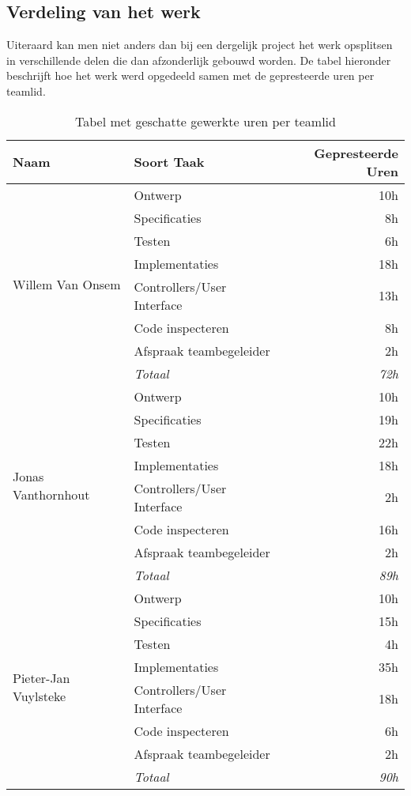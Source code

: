 \subsection{Verdeling van het werk}
Uiteraard kan men niet anders dan bij een dergelijk project het werk opsplitsen in verschillende delen die dan afzonderlijk gebouwd worden. De tabel hieronder beschrijft hoe het werk werd opgedeeld samen met de gepresteerde uren per teamlid.
\begin{table}[H]
\centering
\begin{tabular}{|l|l|r|}
\hline
\textbf{Naam}&\textbf{Soort Taak}&\textbf{Gepresteerde Uren}\\\hline\hline
\multirow{8}{*}{Willem Van Onsem}&Ontwerp&10h\\
&Specificaties&8h\\
&Testen&6h\\
&Implementaties&18h\\
&Controllers/User Interface&13h\\
&Code inspecteren&8h\\
&Afspraak teambegeleider&2h\\
&\textit{Totaal}&\textit{72h}\\\hline
\multirow{8}{*}{Jonas Vanthornhout}&Ontwerp&10h\\
&Specificaties&19h\\
&Testen&22h\\
&Implementaties&18h\\
&Controllers/User Interface&2h\\
&Code inspecteren&16h\\
&Afspraak teambegeleider&2h\\
&\textit{Totaal}&\textit{89h}\\\hline
\multirow{8}{*}{Pieter-Jan Vuylsteke}&Ontwerp&10h\\
&Specificaties&15h\\
&Testen&4h\\
&Implementaties&35h\\
&Controllers/User Interface&18h\\
&Code inspecteren&6h\\
&Afspraak teambegeleider&2h\\
&\textit{Totaal}&\textit{90h}\\\hline
\end{tabular}
\caption{Tabel met geschatte gewerkte uren per teamlid}
\label{tbl:workedHours}
\end{table}
